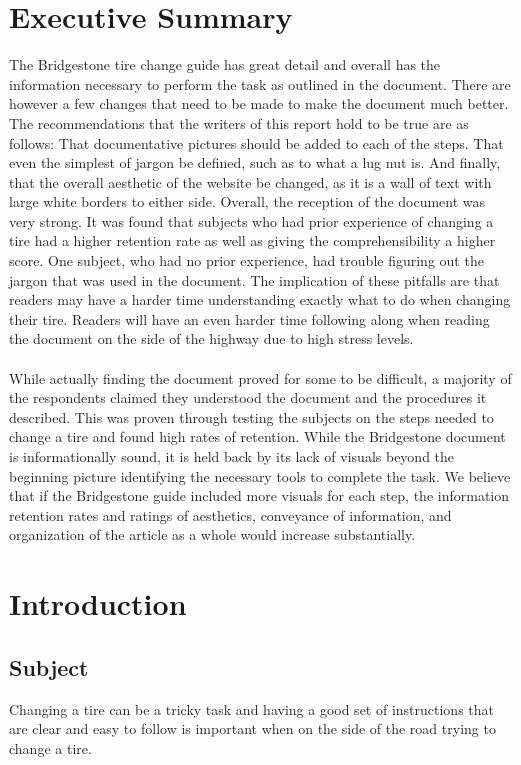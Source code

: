 \documentclass[12pt,A4paper]{article}
\begin{document}
	\section{Executive Summary}
	The Bridgestone tire change guide has great detail and overall has the information necessary to perform the task as outlined in the document. There are however a few changes that need to be made to make the document much better. The recommendations that the writers of this report hold to be true are as follows: That documentative pictures should be added to each of the steps. That even the simplest of jargon be defined, such as to what a lug nut is. And finally, that the overall aesthetic of the website be changed, as it is a wall of text with large white borders to either side. Overall, the reception of the document was very strong. It was found that subjects who had prior experience of changing a tire had a higher retention rate as well as giving the comprehensibility a higher score. One subject, who had no prior experience, had trouble figuring out the jargon that was used in the document. The implication of these pitfalls are that readers may have a harder time understanding exactly what to do when changing their tire. Readers will have an even harder time following along when reading the document on the side of the highway due to high stress levels. \\ \\
	While actually finding the document proved for some to be difficult, a majority of the respondents claimed they understood the document and the procedures it described. This was proven through testing the subjects on the steps needed to change a tire and found high rates of retention. While the Bridgestone document is informationally sound, it is held back by its lack of visuals beyond the beginning picture identifying the necessary tools to complete the task. We believe that if the Bridgestone guide included more visuals for each step, the information retention rates and ratings of aesthetics, conveyance of information, and organization of the article as a whole would increase substantially.

	\section{Introduction}
	
		\subsection{Subject}
		Changing a tire can be a tricky task and having a good set of instructions that are clear and easy to follow is important when on the side of the road trying to change a tire.
\end{document}
